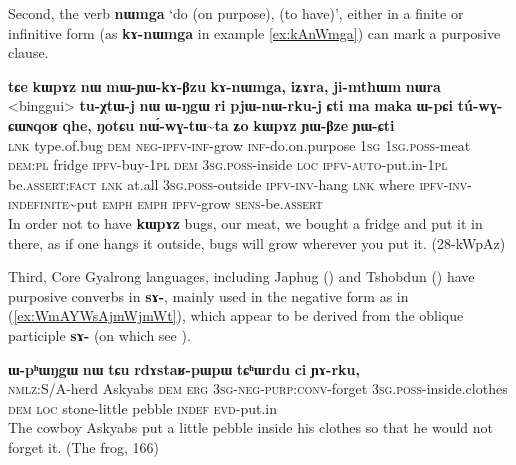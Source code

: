 \documentclass[oldfontcommands,oneside,a4paper,11pt]{article}
\newcommand{\ipa}[1]{\mbox{\phon\textbf{#1}}} %
\begin{document}
Second, the verb \ipa{nɯmga} `do (on purpose), (to have)', either in a finite or infinitive form (as \ipa{kɤ-nɯmga}  in example \ref{ex:kAnWmga}) can mark a purposive clause.

\begin{exe}
\ex \label{ex:kAnWmga}
\gll 
\ipa{tɕe} 	\ipa{kɯpɤz} 	\ipa{nɯ} 	\ipa{mɯ-ɲɯ-kɤ-βzu} 	\ipa{kɤ-nɯmga,} 	\ipa{iʑɤra,} \ipa{ji-mthɯm} 	\ipa{nɯra} 	<binggui> 	\ipa{tu-χtɯ-j} \ipa{nɯ} 	\ipa{ɯ-ŋgɯ} 	\ipa{ri} 	\ipa{pjɯ-nɯ-rku-j} 	\ipa{ɕti} 	\ipa{ma} \ipa{maka} 	\ipa{ɯ-pɕi} 	\ipa{tú-wɣ-ɕɯɴqoʁ} 	\ipa{qhe,} \ipa{ŋotɕu} 	\ipa{nɯ́-wɣ-tɯ\textasciitilde{}ta} 	\ipa{ʑo} 	\ipa{kɯpɤz} 	\ipa{ɲɯ-βze} 	\ipa{ɲɯ-ɕti}\\
\textsc{lnk} type.of.bug \textsc{dem} \textsc{neg-ipfv-inf}-grow \textsc{inf}-do.on.purpose \textsc{1sg} \textsc{1sg.poss}-meat \textsc{dem:pl} fridge \textsc{ipfv}-buy-\textsc{1pl} \textsc{dem} \textsc{3sg.poss}-inside \textsc{loc} \textsc{ipfv-auto}-put.in-\textsc{1pl} be.\textsc{assert:fact} \textsc{lnk} at.all \textsc{3sg.poss}-outside \textsc{ipfv-inv}-hang \textsc{lnk} where \textsc{ipfv-inv}-\textsc{indefinite}\textasciitilde{}put \textsc{emph} \textsc{emph} \textsc{ipfv}-grow \textsc{sens}-be.\textsc{assert}\\
\glt In order not to have \ipa{kɯpɤz} bugs, our meat, we bought a fridge and put it in there, as if one hangs it outside, bugs will grow wherever you put it. (28-kWpAz)
\end{exe}
 

Third, Core Gyalrong languages, including Japhug (\citealt{jacques14linking}) and Tshobdun (\citealt{sun12complementation}) have purposive converbs in \ipa{sɤ-}, mainly used in the negative form as in (\ref{ex:WmAYWsAjmWjmWt}), which appear to be derived from the oblique participle \ipa{sɤ-} (on which see \citealt{jacques16relatives}).
 
\begin{exe}
\ex \label{ex:WmAYWsAjmWjmWt}
\gll
[\ipa{kɯ-lɤɣ}   	\ipa{acɤβ}   	\ipa{nɯ}   	\ipa{kɯ}   	\ipa{\textbf{ɯ-mɤ-sɤ-jmɯ\textasciitilde{}jmɯt}},]   	\ipa{ɯ-pʰɯŋgɯ}   	\ipa{nɯ}   	\ipa{tɕu}   	\ipa{rdɤstaʁ-pɯpɯ}   	\ipa{tɕʰɯrdu}   	\ipa{ci}  \ipa{ɲɤ-rku,}\\
 \textsc{nmlz}:S/A-herd Askyabs \textsc{dem} \textsc{erg}  \textsc{3sg-neg-purp:conv}-forget \textsc{3sg.poss}-inside.clothes \textsc{dem} \textsc{loc} stone-little pebble \textsc{indef}
 \textsc{evd}-put.in\\
\glt The cowboy Askyabs put a little pebble inside his clothes so that he would not forget it. (The frog, 166)
\end{exe}
\end{document}
